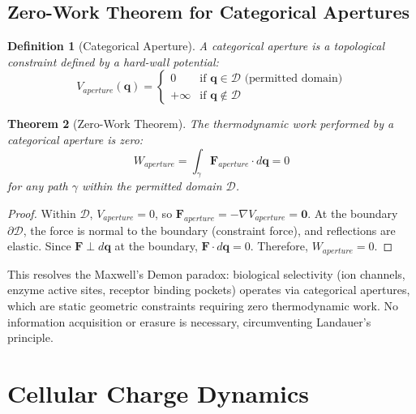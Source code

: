 \documentclass[12pt,a4paper]{article}
\newtheorem{theorem}{Theorem}[section]
\newtheorem{definition}[theorem]{Definition}
\begin{document}
\subsection{Zero-Work Theorem for Categorical Apertures}

\begin{definition}[Categorical Aperture]
A categorical aperture is a topological constraint defined by a hard-wall potential:
\begin{equation}
V_{aperture}(\mathbf{q}) = 
\begin{cases}
0 & \text{if } \mathbf{q} \in \mathcal{D} \text{ (permitted domain)} \\
+\infty & \text{if } \mathbf{q} \notin \mathcal{D}
\end{cases}
\end{equation}
\end{definition}

\begin{theorem}[Zero-Work Theorem]
\label{thm:zerowork}
The thermodynamic work performed by a categorical aperture is zero:
\begin{equation}
W_{aperture} = \int_\gamma \mathbf{F}_{aperture} \cdot d\mathbf{q} = 0
\end{equation}
for any path $\gamma$ within the permitted domain $\mathcal{D}$.
\end{theorem}

\begin{proof}
Within $\mathcal{D}$, $V_{aperture} = 0$, so $\mathbf{F}_{aperture} = -\nabla V_{aperture} = \mathbf{0}$. At the boundary $\partial \mathcal{D}$, the force is normal to the boundary (constraint force), and reflections are elastic. Since $\mathbf{F} \perp d\mathbf{q}$ at the boundary, $\mathbf{F} \cdot d\mathbf{q} = 0$. Therefore, $W_{aperture} = 0$.
\end{proof}

This resolves the Maxwell's Demon paradox: biological selectivity (ion channels, enzyme active sites, receptor binding pockets) operates via categorical apertures, which are static geometric constraints requiring zero thermodynamic work. No information acquisition or erasure is necessary, circumventing Landauer's principle.

\section{Cellular Charge Dynamics}
\end{document}
